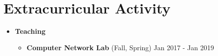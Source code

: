 \documentclass[a4paper,10pt]{article} %
\begin{document}
\color{blue}
\section{Extracurricular Activity}
\color{Black}
\begin{itemize}
	
	\item \textbf{Teaching}
	\begin{itemize}
		\item	
		\textbf{Computer Network Lab } (Fall, Spring) 
		\hfill {Jan 2017 - Jan 2019}
	\end{itemize}


\end{itemize}
\end{document}
